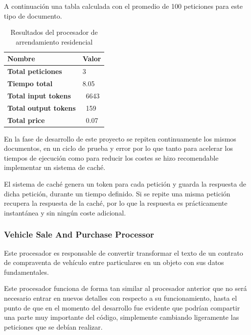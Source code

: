 A continuación una tabla calculada con el promedio de 100 peticiones para este tipo de documento.

\begin{table}[h]
    \renewcommand{\arraystretch}{1.5}
    \setlength{\tabcolsep}{10pt}
    \centering
    \begin{tabular}{>{\bfseries}p{} p{}}
        \toprule
        \textbf{Nombre}     & \textbf{Valor} \\
        \midrule
        Total peticiones    & 3              \\
        Tiempo total        & 8.05           \\
        Total input tokens  & ~6643          \\
        Total output tokens & ~159           \\
        Total price         & ~0.07          \\
        \bottomrule
    \end{tabular}
    \caption{Resultados del procesador de arrendamiento residencial}
    \label{tab:residential_lease_processor}
\end{table}

En la fase de desarrollo de este proyecto se repiten continuamente los mismos documentos, en un ciclo de prueba y error
por lo que tanto para acelerar los tiempos de ejecución como para reducir los costes se hizo recomendable implementar
un sistema de caché.

El sistema de caché genera un token para cada petición y guarda la respuesta de dicha petición, durante un tiempo
definido.
Si se repite una misma petición recupera la respuesta de la caché, por lo que la respuesta es prácticamente
instantánea y sin ningún coste adicional.

\subsubsection*{Vehicle Sale And Purchase Processor}

Este procesador es responsable de convertir transformar el texto de un contrato de compraventa de vehículo entre
particulares en un objeto con sus datos fundamentales.

Este procesador funciona de forma tan similar al procesador anterior que no será necesario entrar en nuevos detalles
con respecto a su funcionamiento, hasta el punto de que en el momento del desarrollo fue evidente que podrían
compartir una parte muy importante del código, simplemente cambiando ligeramente las peticiones que se debían realizar.

